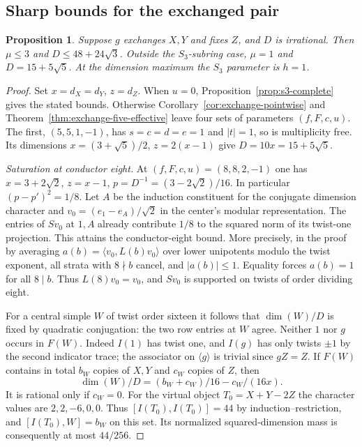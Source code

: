 \documentclass[11pt,a4paper]{article}
\newtheorem{proposition}[theorem]{Proposition}
\numberwithin{equation}{section}
\begin{document}
\subsection{Sharp bounds for the exchanged pair}
\begin{proposition}\label{prop:sharp-exchange}
Suppose $g$ exchanges $X,Y$ and fixes $Z$, and $D$ is irrational. Then $\mu\le3$ and $D\le48+24\sqrt3$. Outside the $S_3$-subring case, $\mu=1$ and $D=15+5\sqrt5$. At the dimension maximum the $S_3$ parameter is $h=1$.
\end{proposition}
\begin{proof}
Set $x=d_X=d_Y$, $z=d_Z$. When $u=0$, Proposition~\ref{prop:s3-complete} gives the stated bounds. Otherwise Corollary~\ref{cor:exchange-pointwise} and Theorem~\ref{thm:exchange-five-effective} leave four sets of parameters $(f,F,c,u)$. The first, $(5,5,1,-1)$, has $s=c=d=e=1$ and $|t|=1$, so is multiplicity free. Its dimensions $x=(3+\sqrt5)/2$, $z=2(x-1)$ give $D=10x=15+5\sqrt5$.

\par\smallskip\noindent\emph{Saturation at conductor eight.}\enspace
At $(f,F,c,u)=(8,8,2,-1)$ one has $x=3+2\sqrt2$, $z=x-1$, $p=D^{-1}=(3-2\sqrt2)/16$. In particular $(p-p')^2=1/8$. Let $A$ be the induction constituent for the conjugate dimension character and $v_0=(e_1-e_A)/\sqrt2$ in the center's modular representation. The entries of $Sv_0$ at $1,A$ already contribute $1/8$ to the squared norm of its twist-one projection. This attains the conductor-eight bound. More precisely, in the proof by averaging $a(b)=\langle v_0,L(b)v_0\rangle$ over lower unipotents modulo the twist exponent, all strata with $8\nmid b$ cancel, and $|a(b)|\le1$. Equality forces $a(b)=1$ for all $8\mid b$. Thus $L(8)v_0=v_0$, and $Sv_0$ is supported on twists of order dividing eight.

For a central simple $W$ of twist order sixteen it follows that $\dim(W)/D$ is fixed by quadratic conjugation: the two row entries at $W$ agree. Neither $1$ nor $g$ occurs in $F(W)$. Indeed $I(1)$ has twist one, and $I(g)$ has only twists $\pm1$ by the second indicator trace; the associator on $\langle g\rangle$ is trivial since $gZ=Z$. If $F(W)$ contains in total $b_W$ copies of $X,Y$ and $c_W$ copies of $Z$, then
\[
 \dim(W)/D=(b_W+c_W)/16-c_W/(16x).
\]
It is rational only if $c_W=0$. For the virtual object $T_0=X+Y-2Z$ the character values are $2,2,-6,0,0$. Thus $[I(T_0),I(T_0)]=44$ by induction--restriction, and $[I(T_0),W]=b_W$ on this set. Its normalized squared-dimension mass is consequently at most $44/256$.


\end{proof}
\end{document}
